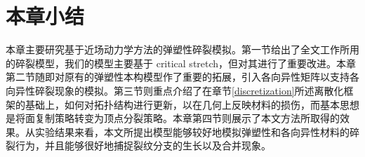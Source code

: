 \newpage
\section{本章小结}
本章主要研究基于近场动力学方法的弹塑性碎裂模拟。第一节给出了全文工作所用的碎裂模型，我们的模型主要基于 critical stretch，但对其进行了重要改进。本章第二节随即对原有的弹塑性本构模型作了重要的拓展，引入各向异性矩阵以支持各向异性碎裂现象的模拟。第三节则重点介绍了在章节\ref{discretization}所述离散化框架的基础上，如何对拓扑结构进行更新，以在几何上反映材料的损伤，而基本思想是将面复制策略转变为顶点分裂策略。本章第四节则展示了本文方法所取得的效果。从实验结果来看，本文所提出模型能够较好地模拟弹塑性和各向异性材料的碎裂行为，并且能够很好地捕捉裂纹分支的生长以及合并现象。
